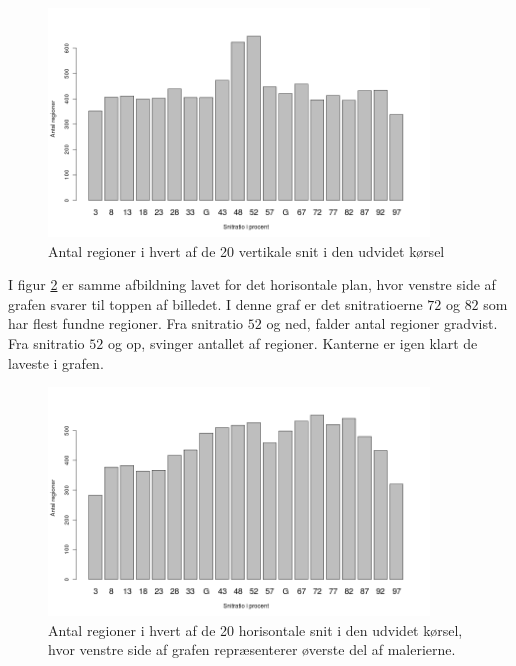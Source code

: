 {\begin{figure}[h!]
	\begin{center}
		\includegraphics[width=0.9\textwidth]{afsnit/resultater/billeder/cut0cut1eatsperratioU.png}
	\end{center}
	\caption{Antal regioner i hvert af de 20 vertikale snit i den udvidet kørsel}
	\label{antal_regioner_vertikale_cut_udvidet}
\end{figure}

I figur \ref{antal_regioner_horisontale_cut_udvidet} er samme afbildning
lavet for det horisontale plan, hvor venstre side af grafen svarer til
toppen af billedet. I denne graf er det snitratioerne $72$ og $82$ som
har flest fundne regioner. Fra snitratio $52$ og ned, falder antal
regioner gradvist. Fra snitratio $52$ og op, svinger antallet af
regioner. Kanterne er igen klart de laveste i grafen.

\begin{figure}[h!]
	\begin{center}
		\includegraphics[width=0.9\textwidth]{afsnit/resultater/billeder/cut2cut3eatsperratioU.png}
	\end{center}
    \caption{Antal regioner i hvert af de 20 horisontale snit i den udvidet kørsel, hvor
    venstre side af grafen repræsenterer øverste del af malerierne. }
    \label{antal_regioner_horisontale_cut_udvidet}
\end{figure}

}
